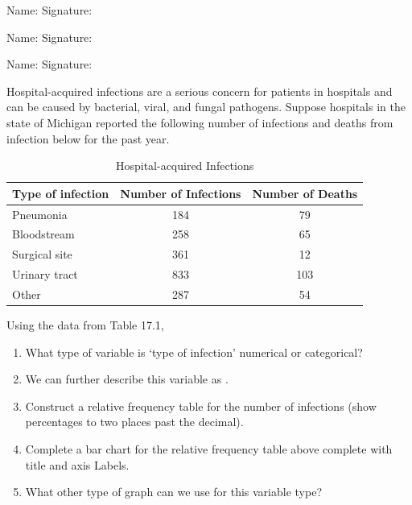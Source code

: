 \documentclass[11pt, chapterprefix=true]{scrbook}\usepackage[]{graphicx}\usepackage[]{color}
\begin{document}
\begin{exercises}
\begin{exercise}
\begin{center}
{{\vspace{4mm}
Name: \underline{\phantom{xxxxxxxxxxxxxxxxxxxxxxxx}} Signature: \underline{\phantom{xxxxxxxxxxxxxxxxxxxxxxxx}}

\vspace{4mm}
Name: \underline{\phantom{xxxxxxxxxxxxxxxxxxxxxxxx}} Signature: \underline{\phantom{xxxxxxxxxxxxxxxxxxxxxxxx}}

\vspace{4mm}
Name: \underline{\phantom{xxxxxxxxxxxxxxxxxxxxxxxx}} Signature: \underline{\phantom{xxxxxxxxxxxxxxxxxxxxxxxx}}
 }}
\end{center}

Hospital-acquired infections are a serious concern for patients in hospitals and can be caused by bacterial, viral, and fungal pathogens.  Suppose hospitals in the state of Michigan reported the following number of infections and deaths from infection below for the past year.  

\begin{table}[ht]
\centering
\caption{Hospital-acquired Infections}
\begin{tabular}{@{} lcc @{}} \hline
Type of infection & Number of Infections & Number of Deaths \\ \hline
Pneumonia & 184 & 79 \\
Bloodstream & 258 & 65 \\
Surgical site &	361 & 12 \\	
Urinary tract	&	833 & 103 \\
Other	& 287 & 54 \\ \hline 
\end{tabular}
\end{table}
    
    Using the data from Table 17.1,

\begin{enumerate}
  \item What type of variable is `type of infection' numerical or categorical?
  \item	We can further describe this variable as \underline{\phantom{xxxxxxxxxxxxxxx}}.
  \item	Construct a relative frequency table for the number of infections (show percentages to two places past the decimal).
  \item	Complete a bar chart for the relative frequency table above complete with title and axis Labels.
  \item	What other type of graph can we use for this variable type?
\end{enumerate}
    \end{exercise}
    \begin{solution} %
      

\end{solution}
\end{exercises}
\end{document}
